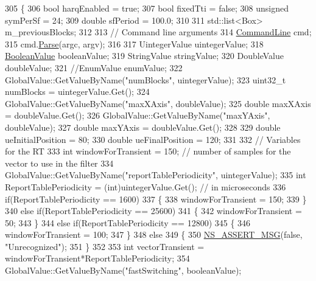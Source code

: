 \begin{DoxyCode}
305 \{
306   \textcolor{keywordtype}{bool} harqEnabled = \textcolor{keyword}{true};
307   \textcolor{keywordtype}{bool} fixedTti = \textcolor{keyword}{false};
308   \textcolor{keywordtype}{unsigned} symPerSf = 24;
309   \textcolor{keywordtype}{double} sfPeriod = 100.0;
310 
311   std::list<Box>  m\_previousBlocks;
312 
313   \textcolor{comment}{// Command line arguments}
314   \hyperlink{classns3_1_1CommandLine}{CommandLine} cmd;
315   cmd.\hyperlink{classns3_1_1CommandLine_a5c10b85b3207e5ecb48d907966923156}{Parse}(argc, argv);
316 
317   UintegerValue uintegerValue;
318   \hyperlink{classns3_1_1BooleanValue}{BooleanValue} booleanValue;
319   StringValue stringValue;
320   DoubleValue doubleValue;
321   \textcolor{comment}{//EnumValue enumValue;}
322   GlobalValue::GetValueByName(\textcolor{stringliteral}{"numBlocks"}, uintegerValue);
323   uint32\_t numBlocks = uintegerValue.Get();
324   GlobalValue::GetValueByName(\textcolor{stringliteral}{"maxXAxis"}, doubleValue);
325   \textcolor{keywordtype}{double} maxXAxis = doubleValue.Get();
326   GlobalValue::GetValueByName(\textcolor{stringliteral}{"maxYAxis"}, doubleValue);
327   \textcolor{keywordtype}{double} maxYAxis = doubleValue.Get();
328 
329   \textcolor{keywordtype}{double} ueInitialPosition = 80;
330   \textcolor{keywordtype}{double} ueFinalPosition = 120;
331 
332   \textcolor{comment}{// Variables for the RT }
333   \textcolor{keywordtype}{int} windowForTransient = 150; \textcolor{comment}{// number of samples for the vector to use in the filter}
334   GlobalValue::GetValueByName(\textcolor{stringliteral}{"reportTablePeriodicity"}, uintegerValue);
335   \textcolor{keywordtype}{int} ReportTablePeriodicity = (int)uintegerValue.Get(); \textcolor{comment}{// in microseconds}
336   \textcolor{keywordflow}{if}(ReportTablePeriodicity == 1600)
337   \{
338     windowForTransient = 150;
339   \}
340   \textcolor{keywordflow}{else} \textcolor{keywordflow}{if}(ReportTablePeriodicity == 25600)
341   \{
342     windowForTransient = 50;
343   \}
344   \textcolor{keywordflow}{else} \textcolor{keywordflow}{if}(ReportTablePeriodicity == 12800)
345   \{
346     windowForTransient = 100;
347   \}
348   \textcolor{keywordflow}{else}
349   \{
350     \hyperlink{assert_8h_aff5ece9066c74e681e74999856f08539}{NS\_ASSERT\_MSG}(\textcolor{keyword}{false}, \textcolor{stringliteral}{"Unrecognized"});
351   \}
352 
353   \textcolor{keywordtype}{int} vectorTransient = windowForTransient*ReportTablePeriodicity;
354   GlobalValue::GetValueByName(\textcolor{stringliteral}{"fastSwitching"}, booleanValue);

\end{DoxyCode}
